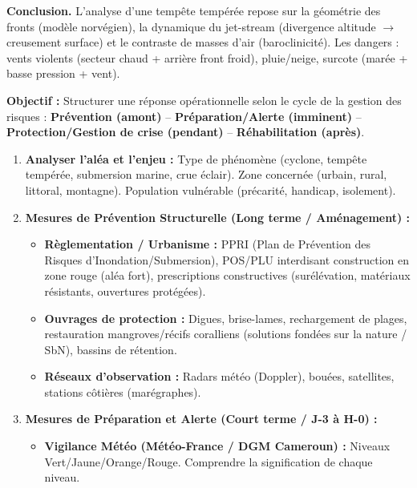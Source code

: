 \documentclass[11pt]{article}
\newcommand{\cle}[1]{{\popxbold\color{popdark}#1}}
\begin{document}
\begin{exoresolu}
\textbf{Conclusion.} L'analyse d'une tempête tempérée repose sur la géométrie des fronts (modèle norvégien), la dynamique du jet-stream (divergence altitude $\to$ creusement surface) et le contraste de masses d'air (baroclinicité). Les dangers : vents violents (secteur chaud + arrière front froid), pluie/neige, surcote (marée + basse pression + vent).
\end{exoresolu}


\begin{methode}
\textbf{Objectif :} Structurer une réponse opérationnelle selon le cycle de la gestion des risques : \textbf{Prévention (amont)} -- \textbf{Préparation/Alerte (imminent)} -- \textbf{Protection/Gestion de crise (pendant)} -- \textbf{Réhabilitation (après)}.
\begin{enumerate}
    \item \textbf{Analyser l'aléa et l'enjeu :} Type de phénomène (cyclone, tempête tempérée, submersion marine, crue éclair). Zone concernée (urbain, rural, littoral, montagne). Population vulnérable (précarité, handicap, isolement).
    \item \textbf{Mesures de Prévention Structurelle (Long terme / Aménagement) :}
    \begin{itemize}
        \item \textbf{Règlementation / Urbanisme :} \cle{PPRI} (Plan de Prévention des Risques d'Inondation/Submersion), \cle{POS/PLU} interdisant construction en zone rouge (aléa fort), prescriptions constructives (surélévation, matériaux résistants, ouvertures protégées).
        \item \textbf{Ouvrages de protection :} Digues, brise-lames, rechargement de plages, restauration mangroves/récifs coralliens (solutions fondées sur la nature / \cle{SbN}), bassins de rétention.
        \item \textbf{Réseaux d'observation :} Radars météo (Doppler), bouées, satellites, stations côtières (marégraphes).
    \end{itemize}
    \item \textbf{Mesures de Préparation et Alerte (Court terme / J-3 à H-0) :}
    \begin{itemize}
        \item \textbf{Vigilance Météo (Météo-France / DGM Cameroun) :} Niveaux Vert/Jaune/Orange/Rouge. Comprendre la signification de chaque niveau.

\end{itemize}
\end{enumerate}
\end{methode}
\end{document}
